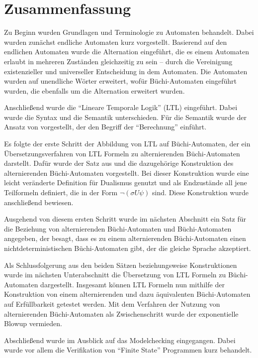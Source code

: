 \section{Zusammenfassung}

Zu Beginn wurden Grundlagen und Terminologie zu Automaten behandelt. Dabei wurden zunächst endliche Automaten kurz vorgestellt. Basierend auf den endlichen Automaten wurde die Alternation eingeführt, die es einem Automaten erlaubt in mehreren Zuständen gleichzeitig zu sein -- durch die Vereinigung existenzieller und universeller Entscheidung in dem Automaten. Die Automaten wurden auf unendliche Wörter erweitert, wofür Büchi-Automaten eingeführt wurden, die ebenfalls um die Alternation erweitert wurden.

Anschließend wurde die "`Lineare Temporale Logik"' (LTL) eingeführt. Dabei wurde die Syntax und die Semantik unterschieden. Für die Semantik wurde der Ansatz von \cite{vardi+96} vorgestellt, der den Begriff der "`Berechnung"' einführt.

Es folgte der erste Schritt der Abbildung von LTL auf Büchi-Automaten, der ein Übersetzungsverfahren von LTL Formeln zu alternierenden Büchi-Automaten darstellt. Dafür wurde der Satz aus \cite{vardi+96} und die dazugehörige Konstruktion des alternierenden Büchi-Automaten vorgestellt. Bei dieser Konstruktion wurde eine leicht veränderte Definition für Dualismus genutzt und als Endzustände all jene Teilformeln definiert, die in der Form $\lnot(\sigma U\psi)$ sind. Diese Konstruktion wurde anschließend bewiesen.

Ausgehend von diesem ersten Schritt wurde im nächsten Abschnitt ein Satz für die Beziehung von alternierenden Büchi-Automaten und Büchi-Automaten angegeben, der besagt, dass es zu einem alternierenden Büchi-Automaten einen nichtdeterministischen Büchi-Automaten gibt, der die gleiche Sprache akzeptiert.

Als Schlussfolgerung aus den beiden Sätzen beziehungsweise Konstruktionen wurde im nächsten Unterabschnitt die Übersetzung von LTL Formeln zu Büchi-Automaten dargestellt. Insgesamt können LTL Formeln nun mithilfe der Konstruktion von einem alternierenden und dazu äquivalenten Büchi-Automaten auf Erfüllbarkeit getestet werden. Mit dem Verfahren der Nutzung von alternierenden Büchi-Automaten als Zwischenschritt wurde der exponentielle Blowup vermieden.

Abschließend wurde im Ausblick auf das Modelchecking eingegangen. Dabei wurde vor allem die Verifikation von "`Finite State"' Programmen kurz behandelt. 